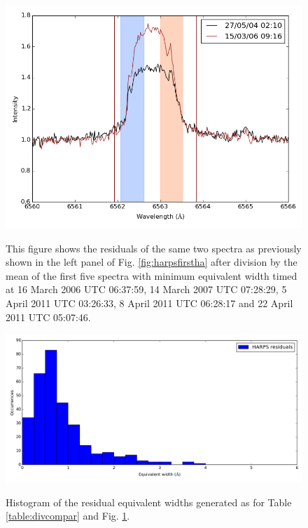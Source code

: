 \begin{figure}[!htbp]
\begin{center}
\includegraphics[scale=0.4]{Figures/harpsfirsthad5.png} \\
\end{center}   
\caption{This figure shows the residuals of the same two spectra as previously shown in the left panel of
 Fig. \ref{fig:harpsfirstha} after division by the mean of the first five spectra with minimum equivalent width
timed at 16 March 2006 UTC 06:37:59, 14 March 2007 UTC 07:28:29, 5 April 2011 UTC 03:26:33, 8 April 2011 UTC 06:28:17
and 22 April 2011 UTC 05:07:46.}
\protect\label{fig:harpsfirsthad5}
\end{figure}

\begin{figure}[!htbp]
\begin{center}
\includegraphics[scale=0.4]{Figures/residhists.png} \\
\end{center}   
\caption{Histogram of the residual equivalent widths generated as for Table \ref{table:divcompar} and Fig. \ref{fig:harpsfirsthad5}.}
\protect\label{fig:residhists}
\end{figure}

